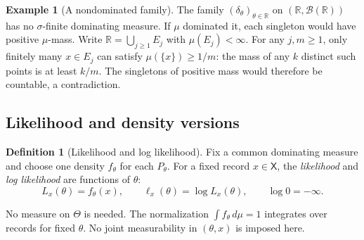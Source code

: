 \documentclass[11pt,oneside]{book}
\theoremstyle{definition}
\newtheorem{definition}[theorem]{Definition}
\newtheorem{example}[theorem]{Example}
\theoremstyle{remark}
\newcommand{\R}{\mathbb R}
\begin{document}
\begin{example}[A nondominated family]
\label{ex:nondominated-dirac}
The family $(\delta_\theta)_{\theta\in\R}$ on $(\R,\mathcal B(\R))$ has
no $\sigma$-finite dominating measure. If $\mu$ dominated it, each singleton
would have positive $\mu$-mass. Write $\R=\bigcup_{j\geq1}E_j$ with
$\mu(E_j)<\infty$. For any $j,m\geq1$, only finitely many $x\in E_j$
can satisfy $\mu(\{x\})\geq1/m$: the mass of any $k$ distinct such points
is at least $k/m$. The singletons of positive mass would therefore be
countable, a contradiction.
\end{example}

\subsection{Likelihood and density versions}
\label{subsec:likelihood-versions}

\begin{definition}[Likelihood and log likelihood]
\label{def:likelihood}
Fix a common dominating measure and choose one density $f_\theta$ for each
$P_\theta$. For a fixed record $x\in\mathsf X$, the \emph{likelihood} and
\emph{log likelihood} are functions of $\theta$:
\[
L_x(\theta)=f_\theta(x),\qquad
\ell_x(\theta)=\log L_x(\theta),\qquad \log 0=-\infty.
\]
\end{definition}

No measure on $\Theta$ is needed. The normalization
$\int f_\theta\,d\mu=1$ integrates over records for fixed $\theta$.
No joint measurability in $(\theta,x)$ is imposed here.
\end{document}
